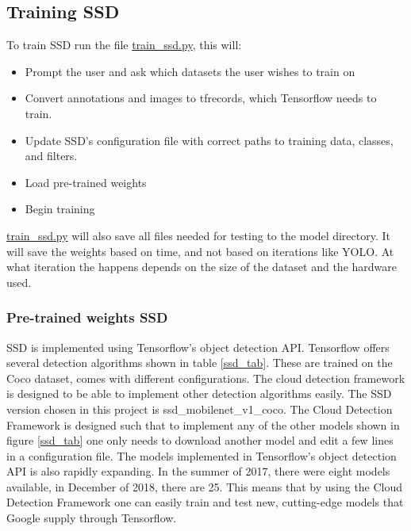 \newpage

\subsection{Training SSD}
To train SSD run the file \url{train_ssd.py}, this will:

\begin{itemize}
    \item Prompt the user and ask which datasets the user wishes to train on
    \item Convert annotations and images to tfrecords, which Tensorflow needs to train.
    \item Update SSD's configuration file with correct paths to training data, classes, and filters.
    \item Load pre-trained weights
    \item Begin training
\end{itemize}

\url{train_ssd.py} will also save all files needed for testing to the model directory. It will save the weights based on time, and not based on iterations like YOLO. At what iteration the happens depends on the size of the dataset and the hardware used. 

\subsubsection{Pre-trained weights SSD}
SSD is implemented using Tensorflow's object detection API. Tensorflow offers several detection algorithms shown in table \ref{ssd_tab}. These are trained on the Coco dataset, comes with different configurations. The cloud detection framework is designed to be able to implement other detection algorithms easily. The SSD version chosen in this project is ssd\_mobilenet\_v1\_coco. The Cloud Detection Framework is designed such that to implement any of the other models shown in figure \ref{ssd_tab} one only needs to download another model and edit a few lines in a configuration file. The models implemented in Tensorflow's object detection API is also rapidly expanding. In the summer of 2017, there were eight models available, in December of 2018, there are 25. This means that by using the Cloud Detection Framework one can easily train and test new, cutting-edge models that Google supply through Tensorflow.

